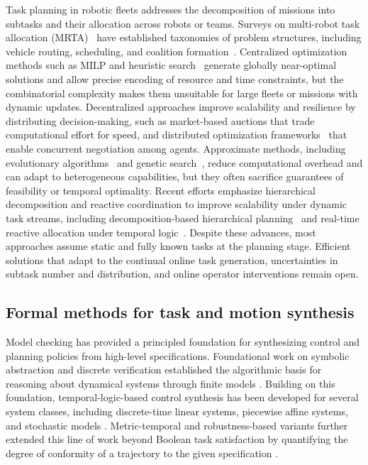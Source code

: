 Task planning in robotic fleets addresses the decomposition of missions into
subtasks and their allocation across robots or teams. Surveys on multi-robot
task allocation (MRTA)~\cite{gini2017multi, torreno2017cooperative}
have established taxonomies of problem structures, including vehicle routing,
scheduling, and coalition formation~\cite{dai2024dynamic}.
Centralized optimization methods such as MILP and heuristic
search~\cite{ji2021multi} generate globally near-optimal
solutions and allow precise encoding of resource and time constraints, but the
combinatorial complexity makes them unsuitable for large fleets or missions with
dynamic updates. Decentralized approaches improve scalability and resilience by
distributing decision-making, such as market-based auctions
\cite{zhao2021market} that trade computational effort for speed, and distributed
optimization frameworks~\cite{fioretto2018distributed} that enable concurrent
negotiation among agents. Approximate methods, including evolutionary
algorithms~\cite{liu2019multi} and genetic search~\cite{martin2021mrta}, reduce
computational overhead and can adapt to heterogeneous capabilities, but they
often sacrifice guarantees of feasibility or temporal optimality.
{Recent efforts emphasize hierarchical decomposition and reactive
coordination to improve scalability under dynamic task streams,
including decomposition-based hierarchical planning~\cite{luo2024decomposition,leahy2021scalable}
and real-time reactive allocation under temporal logic~\cite{chen2025real}.}
Despite these advances, most approaches assume static and fully known tasks at the planning
stage. Efficient solutions that adapt to the continual online task generation,
uncertainties in subtask number and distribution,
and online operator interventions remain open.

\subsection{Formal methods for task and motion synthesis}

Model checking has provided a principled foundation for synthesizing control and
planning policies from high-level specifications. Foundational work on symbolic
abstraction and discrete verification established the algorithmic basis for
reasoning about dynamical systems through finite models
\cite{alur2000discrete,girard2007approximately,baier2008principles}. Building on
this foundation, temporal-logic-based control synthesis has been developed for
several system classes, including discrete-time linear systems, piecewise affine
systems, and stochastic models
\cite{tabuada2006linear,aydin2013temporal,yordanov2010formal,
  kloetzer2008fully,yordanov2012temporal,ding2011mdp}. Metric-temporal and
robustness-based variants further extended this line of work beyond Boolean task
satisfaction by quantifying the degree of conformity of a trajectory to the given
specification \cite{fainekos2009robustness,abbas2013probabilistic}.

